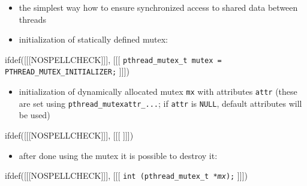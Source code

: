 \begin{slide}

\begin{itemize}
\item the simplest way how to ensure synchronized access to shared data between
threads
\item initialization of statically defined mutex:
\end{itemize}
ifdef([[[NOSPELLCHECK]]], [[[
\texttt{pthread\_mutex\_t mutex = PTHREAD\_MUTEX\_INITIALIZER;}
]]])
\begin{itemize}
\item initialization of dynamically allocated mutex \texttt{mx} with attributes
\texttt{attr} (these are set using \texttt{pthread\_mutexattr\_...};
if \texttt{attr} is \texttt{NULL}, default attributes will be used)
\end{itemize}
ifdef([[[NOSPELLCHECK]]], [[[
]]])
\begin{itemize}
\item after done using the mutex it is possible to destroy it:
\end{itemize}
ifdef([[[NOSPELLCHECK]]], [[[
\texttt{int (pthread\_mutex\_t *\emph{mx});}
]]])
\end{slide}


